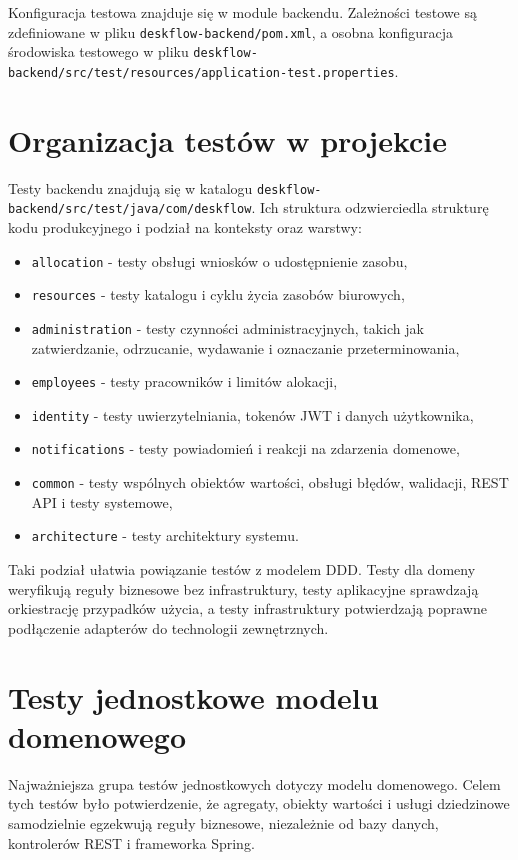 Konfiguracja testowa znajduje się w module backendu. Zależności testowe są zdefiniowane w pliku \texttt{deskflow-backend/pom.xml}, a osobna konfiguracja środowiska testowego w pliku \texttt{deskflow-backend/src/test/resources/application-test.properties}.

\section{Organizacja testów w projekcie}

Testy backendu znajdują się w katalogu \texttt{deskflow-backend/src/test/java/com/deskflow}. Ich struktura odzwierciedla strukturę kodu produkcyjnego i podział na konteksty oraz warstwy:
\begin{itemize}
    \item \texttt{allocation} - testy obsługi wniosków o udostępnienie zasobu,
    \item \texttt{resources} - testy katalogu i cyklu życia zasobów biurowych,
    \item \texttt{administration} - testy czynności administracyjnych, takich jak zatwierdzanie, odrzucanie, wydawanie i oznaczanie przeterminowania,
    \item \texttt{employees} - testy pracowników i limitów alokacji,
    \item \texttt{identity} - testy uwierzytelniania, tokenów JWT i danych użytkownika,
    \item \texttt{notifications} - testy powiadomień i reakcji na zdarzenia domenowe,
    \item \texttt{common} - testy wspólnych obiektów wartości, obsługi błędów, walidacji, REST API i testy systemowe,
    \item \texttt{architecture} - testy architektury systemu.
\end{itemize}

Taki podział ułatwia powiązanie testów z modelem DDD. Testy dla domeny weryfikują reguły biznesowe bez infrastruktury, testy aplikacyjne sprawdzają orkiestrację przypadków użycia, a testy infrastruktury potwierdzają poprawne podłączenie adapterów do technologii zewnętrznych.

\section{Testy jednostkowe modelu domenowego}

Najważniejsza grupa testów jednostkowych dotyczy modelu domenowego. Celem tych testów było potwierdzenie, że agregaty, obiekty wartości i usługi dziedzinowe samodzielnie egzekwują reguły biznesowe, niezależnie od bazy danych, kontrolerów REST i frameworka Spring.


